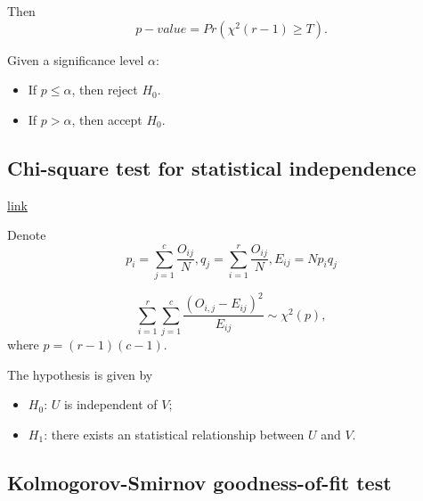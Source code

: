 \begin{refsection}
\begin{note}
Then $$p-value = Pr(\chi^2(r-1)\geq T).$$

	Given a significance level $\alpha$:
	\begin{itemize}
		\item If $p \leq \alpha$, then reject $H_0$.
		\item If $p > \alpha$, then accept $H_0$.
	\end{itemize} 	
\end{note}

\subsection{Chi-square test for statistical independence}

\begin{lemma}\href{https://en.wikipedia.org/wiki/Pearson%27s_chi-squared_test}{link}
	




Denote
$$p_i = \sum_{j=1}^{c}\frac{O_{ij}}{N}, q_j = \sum_{i=1}^{r}\frac{O_{ij}}{N}, E_{ij} = Np_iq_j$$
	
	$$\sum_{i=1}^{r}\sum_{j=1}^{c}\frac{(O_{i,j} - E_{ij})^2}{E_{ij}}\sim \chi^2(p),$$
	where $p = (r- 1)(c-1)$.
	
The hypothesis is given by
\begin{itemize}
	\item $H_0$: $U$ is independent of $V$;
	\item $H_1$: there exists an statistical relationship between $U$ and $V$.
\end{itemize}	
	
\end{lemma}

\subsection{Kolmogorov-Smirnov goodness-of-fit test}





\end{refsection}
